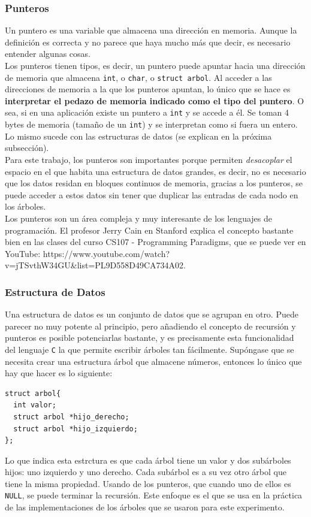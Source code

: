 \documentclass[12pt,letterpaper]{report}
\begin{document}
\subsubsection{Punteros}
Un puntero es una variable que almacena una dirección en memoria. Aunque la definición es correcta y no parece que haya mucho más que decir, es necesario entender algunas cosas.\\

Los punteros tienen tipos, es decir, un puntero puede apuntar hacia una dirección de memoria que almacena \texttt{int}, o \texttt{char}, o \texttt{struct arbol}. Al acceder a las direcciones de memoria a la que los punteros apuntan, lo único que se hace es \textbf{interpretar el pedazo de memoria indicado como el tipo del puntero}. O sea, si en una aplicación existe un puntero a \texttt{int} y se accede a él. Se toman 4 bytes de memoria (tamaño de un \texttt{int}) y se interpretan como si fuera un entero. Lo mismo sucede con las estructuras de datos (se explican en la próxima subsección).\\

Para este trabajo, los punteros son importantes porque permiten \emph{desacoplar} el espacio en el que habita una estructura de datos grandes, es decir, no es necesario que los datos residan en bloques continuos de memoria, gracias a los punteros, se puede acceder a estos datos sin tener que duplicar las entradas de cada nodo en los árboles.\\

Los punteros son un área compleja y muy interesante de los lenguajes de programación. El profesor Jerry Cain en Stanford explica el concepto bastante bien en las clases del curso CS107 - Programming Paradigms, que se puede ver en YouTube: https://www.youtube.com/watch?v=jTSvthW34GU\&list=PL9D558D49CA734A02.

\subsubsection{Estructura de Datos}
Una estructura de datos es un conjunto de datos que se agrupan en otro. Puede parecer no muy potente al principio, pero añadiendo el concepto de recursión y punteros es posible potenciarlas bastante, y es precisamente esta funcionalidad del lenguaje \texttt{C} la que permite escribir árboles tan fácilmente. Supóngase que se necesita crear una estructura árbol que almacene números, entonces lo único que hay que hacer es lo siguiente:
\begin{verbatim}
struct arbol{
  int valor;
  struct arbol *hijo_derecho;
  struct arbol *hijo_izquierdo;
};
\end{verbatim}
Lo que indica esta estrctura es que cada árbol tiene un valor y dos subárboles hijos: uno izquierdo y uno derecho. Cada subárbol es a su vez otro árbol que tiene la misma propiedad. Usando de los punteros, que cuando uno de ellos es \texttt{NULL}, se puede terminar la recursión. Este enfoque es el que se usa en la práctica de las implementaciones de los árboles que se usaron para este experimento.\\
\end{document}
